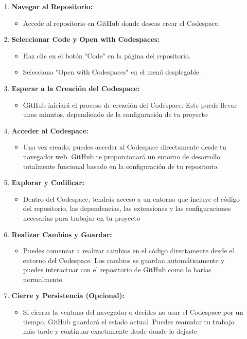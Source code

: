 \begin{enumerate}
    \item \textbf{Navegar al Repositorio:}
    \begin{itemize}
        \item Accede al repositorio en GitHub donde deseas crear el Codespace.        
    \end{itemize}
    \item \textbf{Seleccionar Code y Open with Codespaces:}
    \begin{itemize}
        \item Haz clic en el botón "Code" en la página del repositorio.
        \item Selecciona "Open with Codespaces" en el menú desplegable.
    \end{itemize}
    \item \textbf{Esperar a la Creación del Codespace:}
    \begin{itemize}
        \item GitHub iniciará el proceso de creación del Codespace. Este puede llevar unos minutos,
                 dependiendo de la configuración de tu proyecto
    \end{itemize}
    \item \textbf{Acceder al Codespace:}
    \begin{itemize}
        \item Una vez creado, puedes acceder al Codespace directamente desde tu navegador web. GitHub te 
                proporcionará un entorno de desarrollo totalmente funcional basado en la configuración 
                de tu repositorio.
    \end{itemize}
    \item \textbf{Explorar y Codificar:}
    \begin{itemize}
        \item Dentro del Codespace, tendrás acceso a un entorno que incluye el código del repositorio, 
                las dependencias, las extensiones y las configuraciones necesarias para trabajar en tu proyecto
    \end{itemize}
    \item \textbf{Realizar Cambios y Guardar:}
    \begin{itemize}
        \item Puedes comenzar a realizar cambios en el código directamente desde el entorno del 
                Codespace. Los cambios se guardan automáticamente y puedes interactuar con el 
                repositorio de GitHub como lo harías normalmente.
    \end{itemize}
    \item \textbf{Cierre y Persistencia (Opcional):}
    \begin{itemize}
        \item Si cierras la ventana del navegador o decides no usar el Codespace por un tiempo, GitHub 
                guardará el estado actual. Puedes reanudar tu trabajo más tarde y continuar 
                exactamente desde donde lo dejaste
    \end{itemize}
\end{enumerate}


